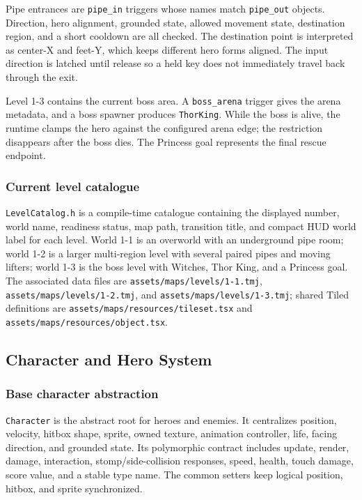 Pipe entrances are \texttt{pipe\_in} triggers whose names match
\texttt{pipe\_out} objects.  Direction, hero alignment, grounded state, allowed
movement state, destination region, and a short cooldown are all checked.  The
destination point is interpreted as center-X and feet-Y, which keeps different
hero forms aligned.  The input direction is latched until release so a held key
does not immediately travel back through the exit.

Level 1-3 contains the current boss area.  A \texttt{boss\_arena} trigger gives
the arena metadata, and a boss spawner produces \texttt{ThorKing}.  While the
boss is alive, the runtime clamps the hero against the configured arena edge;
the restriction disappears after the boss dies.  The Princess goal represents
the final rescue endpoint.

\subsubsection{Current level catalogue}

\texttt{LevelCatalog.h} is a compile-time catalogue containing the displayed
number, world name, readiness status, map path, transition title, and compact
HUD world label for each level.  World 1-1 is an overworld with an underground
pipe room; world 1-2 is a larger multi-region level with several paired pipes
and moving lifters; world 1-3 is the boss level with Witches, Thor King, and a
Princess goal.  The associated data files are
\texttt{assets/maps/levels/1-1.tmj},
\texttt{assets/maps/levels/1-2.tmj}, and
\texttt{assets/maps/levels/1-3.tmj}; shared Tiled definitions are
\texttt{assets/maps/resources/tileset.tsx} and
\texttt{assets/maps/resources/object.tsx}.

\subsection{Character and Hero System}

\subsubsection{Base character abstraction}

\texttt{Character} is the abstract root for heroes and enemies.  It centralizes
position, velocity, hitbox shape, sprite, owned texture, animation controller,
life, facing direction, and grounded state.  Its polymorphic contract includes
update, render, damage, interaction, stomp/side-collision responses, speed,
health, touch damage, score value, and a stable type name.  The common setters
keep logical position, hitbox, and sprite synchronized.

